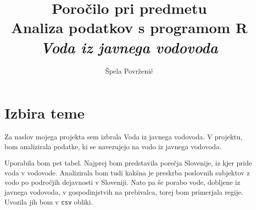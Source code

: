 \documentclass[11pt,a4paper]{article}
\begin{document}
\title{Poročilo pri predmetu \\
Analiza podatkov s programom R\\
\vspace{15mm}
\textbf{\emph{Voda iz javnega vodovoda}}}
\author{Špela Povrženič}
\maketitle


\newpage
\section{Izbira teme}
Za naslov mojega projekta sem izbrala Voda iz javnega vodovoda.
V projektu, bom analizirala podatke, ki se navezujejo na vodo iz javnega vodovoda. 

Uporabila bom pet tabel. 
Najprej bom predstavila porečja Slovenije, iz kjer pride voda v vodovode. Analizirala bom tudi kakšna je preskrba poslovnih subjektov z vodo po področjih dejavnosti v Sloveniji. Nato pa še porabo vode, dobljene iz javnega vodovoda, v gospodinjstvih na prebivalca, torej bom primerjala regije. Uvozila jih bom v \verb|csv| obliki.
\end{document}
